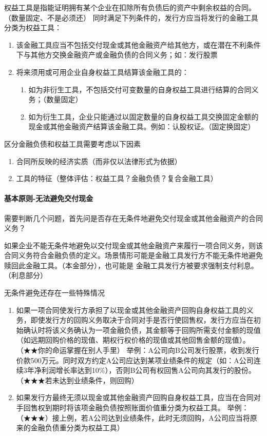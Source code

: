 \documentclass[UTF8,12pt]{ctexart}
\numberwithin{equation}{section} %
\numberwithin{figure}{section}
\numberwithin{table}{section}
\begin{document}
	权益工具是指能证明拥有某个企业在扣除所有负债后的资产中剩余权益的合同。（数量固定、不是必须还）
	同时满足下列条件的，发行方应当将发行的金融工具分类为权益工具：
	\begin{enumerate}
		\item 该金融工具应当不包括交付现金或其他金融资产给其他方，或在潜在不利条件下与其他方交换金融资产或金融负债的合同义务；如：发行股票
		
		\item 将来须用或可用企业自身权益工具结算该金融工具的：
		\begin{enumerate}
			\item 如为非衍生工具，不包括交付可变数量的自身权益工具进行结算的合同义务；（数量固定）
			
			\item 如为衍生工具，企业只能通过以固定数量的自身权益工具交换固定金额的现金或其他金融资产结算该金融工具。例如：认股权证。（固定换固定）
		\end{enumerate}
	\end{enumerate}

	区分金融负债和权益工具需要考虑以下因素
	\begin{enumerate}
		\item 合同所反映的经济实质（而非仅以法律形式为依据）
		
		\item 工具的特征（整体评估：权益工具？金融负债？复合金融工具）
	\end{enumerate}
	
	\paragraph{基本原则-无法避免交付现金}
	需要判断几个问题，首先问是否存在无条件地避免交付现金或其他金融资产的合同义务？
	
	如果企业不能无条件地避免以交付现金或其他金融资产来履行一项合同义务，则该合同义务符合金融负债的定义。场景情形可能是金融工具发行方不能无条件地避免赎回此金融工具。（本金部分），也可能是 金融工具发行方被要求强制支付利息。（利息部分）
	
	无条件避免还存在一些特殊情况
	\begin{enumerate}
		\item 如果一项合同使发行方承担了以现金或其他金融资产回购自身权益工具的义务，即使发行方的回购义务取决于合同对手是否行使回售权，发行方应当在初始确认时将该义务确认为一项金融负债，其金额等于回购所需支付金额的现值（如远期回购价格的现值、期权行权价格的现值或其他回售金额的现值）。（★★你的命运掌握在别人手里）
		举例：A公司向B公司发行股票，收到发行价款500万元。同时双方约定A公司应达到某项业绩条件的规定（如：A公司连续3年净利润增长率达到10\%），否则B公司有权回售A公司向其发行的股份。（★★★若未达到业绩条件，则回购）
		
		\item 如果发行方最终无须以现金或其他金融资产回购自身权益工具，应当在合同对手回售权到期时将该项金融负债按照账面价值重分类为权益工具。
		举例：（★★★）接上例，若A公司达到业绩条件，此时无须回购，A公司应当将原来的金融负债重分类为权益工具）
	\end{enumerate}
\end{document}
